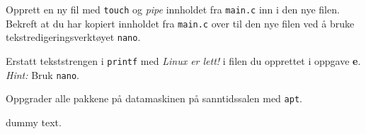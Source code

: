 \begin{subprob}
    Opprett en ny fil med \verb|touch| og \textit{pipe} innholdet fra \verb|main.c| inn i den nye filen. Bekreft at du har kopiert innholdet fra \verb|main.c| over til den nye filen ved å bruke tekstredigeringsverktøyet \verb|nano|.
\end{subprob}

\begin{subprob}
    Erstatt tekststrengen i \verb|printf| med \textit{Linux er lett!} i filen du opprettet i oppgave \textbf{e}. \textit{Hint:} Bruk \verb|nano|.
\end{subprob}

\begin{subprob}
    Oppgrader alle pakkene på datamaskinen på sanntidssalen med \verb|apt|.
	\begin{solution}
	    dummy text. 
	\end{solution}
\end{subprob}


